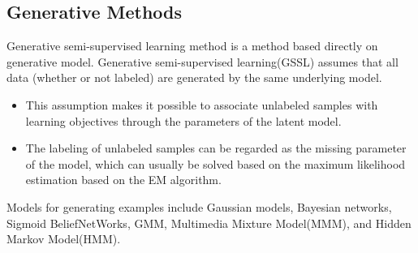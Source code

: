 \documentclass[11pt,en]{elegantpaper}
\begin{document}
\subsection{Generative Methods}
Generative semi-supervised learning method is a method based directly on generative model. Generative semi-supervised learning(GSSL) assumes that all data (whether or not labeled) are generated by the same underlying model.
\begin{itemize}
	\item This assumption makes it possible to associate unlabeled samples with learning objectives through the parameters of the latent model.
	\item The labeling of unlabeled samples can be regarded as the missing parameter of the model, which can usually be solved based on the maximum likelihood estimation based on the EM algorithm.
\end{itemize}
Models for generating examples include Gaussian models, Bayesian networks, Sigmoid BeliefNetWorks, GMM, Multimedia Mixture Model(MMM), and Hidden Markov Model(HMM).
\end{document}
